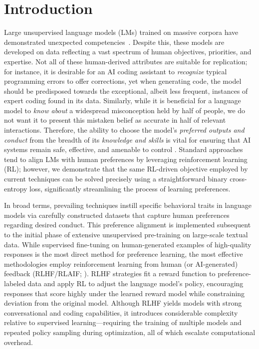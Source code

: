 \section{Introduction}
Large unsupervised language models (LMs) trained on massive corpora have demonstrated unexpected competencies~\citep{chowdhery2022palm, brown2020language, touvron2023llama, bubeck2023sparks}. Despite this, these models are developed on data reflecting a vast spectrum of human objectives, priorities, and expertise. Not all of these human-derived attributes are suitable for replication; for instance, it is desirable for an AI coding assistant to \textit{recognize} typical programming errors to offer corrections, yet when generating code, the model should be predisposed towards the exceptional, albeit less frequent, instances of expert coding found in its data. Similarly, while it is beneficial for a language model to \textit{know about} a widespread misconception held by half of people, we do not want it to present this mistaken belief as accurate in half of relevant interactions. Therefore, the ability to choose the model's \emph{preferred outputs and conduct} from the breadth of its \textit{knowledge and skills} is vital for ensuring that AI systems remain safe, effective, and amenable to control \citep{ouyang2022training}. Standard approaches tend to align LMs with human preferences by leveraging reinforcement learning (RL); however, we demonstrate that the same RL-driven objective employed by current techniques can be solved precisely using a straightforward binary cross-entropy loss, significantly streamlining the process of learning preferences.

In broad terms, prevailing techniques instill specific behavioral traits in language models via carefully constructed datasets that capture human preferences regarding desired conduct. This preference alignment is implemented subsequent to the initial phase of extensive unsupervised pre-training on large-scale textual data. While supervised fine-tuning on human-generated examples of high-quality responses is the most direct method for preference learning, the most effective methodologies employ reinforcement learning from human (or AI-generated) feedback (RLHF/RLAIF; \citep{christiano2017deep,bai2022constitutional}). RLHF strategies fit a reward function to preference-labeled data and apply RL to adjust the language model’s policy, encouraging responses that score highly under the learned reward model while constraining deviation from the original model. Although RLHF yields models with strong conversational and coding capabilities, it introduces considerable complexity relative to supervised learning—requiring the training of multiple models and repeated policy sampling during optimization, all of which escalate computational overhead.

